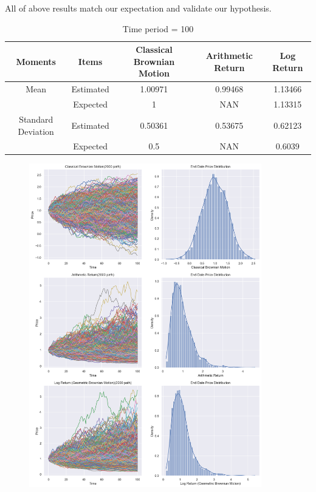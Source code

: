 \documentclass[11pt,en]{elegantpaper}
\begin{document}
All of above results match our expectation and validate our hypothesis.

\begin{table}[htbp]
    \centering
    \caption{Time period = 100}
    \begin{tabular}{@{}ccccc@{}}
        \toprule
        \textbf{Moments} & \textbf{Items} & \textbf{Classical Brownian Motion} & \textbf{Arithmetic Return} & \textbf{Log Return}\\
        \midrule
        Mean & Estimated  & 1.00971 & 0.99468 & 1.13466 \\
        & Expected  & 1       & NAN     & 1.13315 \\
        Standard Deviation& Estimated  & 0.50361 & 0.53675 & 0.62123 \\
        & Expected & 0.5     & NAN     & 0.6039 \\
        \bottomrule
    \end{tabular}
\end{table}

\begin{figure}[htbp] 
    \centering 
    \includegraphics[width=0.9\textwidth]{./image/Problem1_2.png} 
\end{figure}
\end{document}
